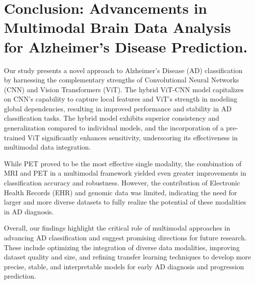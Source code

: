 \section{Conclusion: Advancements in Multimodal Brain Data Analysis for Alzheimer’s Disease Prediction.}
Our study presents a novel approach to Alzheimer’s Disease (AD) classification by harnessing the complementary strengths of Convolutional Neural Networks (CNN) and Vision Transformers (ViT). The hybrid ViT-CNN model capitalizes on CNN's capability to capture local features and ViT's strength in modeling global dependencies, resulting in improved performance and stability in AD classification tasks. The hybrid model exhibits superior consistency and generalization compared to individual models, and the incorporation of a pre-trained ViT significantly enhances sensitivity, underscoring its effectiveness in multimodal data integration.

While PET proved to be the most effective single modality, the combination of MRI and PET in a multimodal framework yielded even greater improvements in classification accuracy and robustness. However, the contribution of Electronic Health Records (EHR) and genomic data was limited, indicating the need for larger and more diverse datasets to fully realize the potential of these modalities in AD diagnosis.

Overall, our findings highlight the critical role of multimodal approaches in advancing AD classification and suggest promising directions for future research. These include optimizing the integration of diverse data modalities, improving dataset quality and size, and refining transfer learning techniques to develop more precise, stable, and interpretable models for early AD diagnosis and progression prediction.